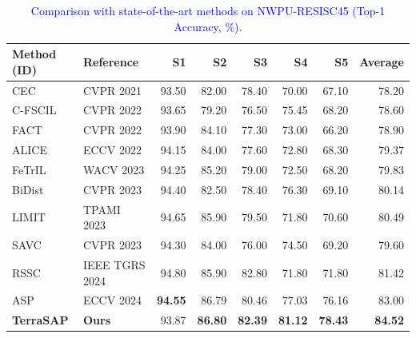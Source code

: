 ﻿\documentclass[letterpaper,journal]{IEEEtran}
\begin{document}
\begin{table}[!t]
\centering
\caption{\textcolor{blue}{Comparison with state-of-the-art methods on NWPU-RESISC45 (Top-1 Accuracy, \%).}}
\label{tab:nwpu_sota}
\begin{tabular}{@{}llrrrrrr@{}}
\toprule
Method (ID) & Reference & S1 & S2 & S3 & S4 & S5 & \textbf{Average} \\
\midrule
CEC & CVPR 2021 \cite{zhang2021} & 93.50 & 82.00 & 78.40 & 70.00 & 67.10 & 78.20 \\
C-FSCIL & CVPR 2022 \cite{hersche2022cfscil} & 93.65 & 79.20 & 76.50 & 75.45 & 68.20 & 78.60 \\
FACT & CVPR 2022 \cite{zhou2022} & 93.90 & 84.10 & 77.30 & 73.00 & 66.20 & 78.90 \\
ALICE & ECCV 2022 \cite{peng2022alice}& 94.15 & 84.00 & 77.60 & 72.80 & 68.30 & 79.37 \\
FeTrIL & WACV 2023 \cite{petit2023fetril}& 94.25 & 85.20 & 79.00 & 72.50 & 68.20 & 79.83 \\
BiDist & CVPR 2023 \cite{zhao2023bidist}& 94.40 & 82.50 & 78.40 & 76.30 & 69.10 & 80.14 \\
LIMIT & TPAMI 2023 \cite{zhou2023limit} & 94.65 & 85.90 & 79.50 & 71.80 & 70.60 & 80.49 \\
SAVC & CVPR 2023 \cite{song2023savc} & 94.30 & 84.00 & 76.00 & 74.50 & 69.20 & 79.60 \\
RSSC & IEEE TGRS 2024 \cite{nwpu_cankao} & 94.80 & 85.90 & 82.80 & 71.80 & 71.80 & 81.42 \\
\midrule
ASP & ECCV 2024 \cite{liu2024} & \textbf{94.55} & 86.79 & 80.46 & 77.03 & 76.16 & 83.00 \\
\textbf{TerraSAP} & \textbf{Ours} & 93.87 & \textbf{86.80} & \textbf{82.39} & \textbf{81.12} & \textbf{78.43} & \textbf{84.52} \\
\bottomrule
\end{tabular}
\end{table}
\end{document}
